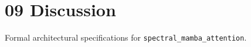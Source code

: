 \section{09 Discussion}

Formal architectural specifications for \texttt{spectral_mamba_attention}.
